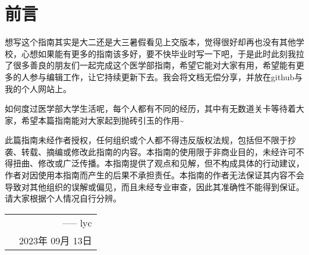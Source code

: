 \thispagestyle{empty}
\chapter*{前言}
想写这个指南其实是大二还是大三暑假看见上交版本，觉得很好却再也没有其他学校，心想如果能有更多的指南该多好，要不快毕业时写一下吧，于是此时此刻我拉了很多善良的朋友们一起完成这个医学部指南，希望它能对大家有用，希望能有更多的人参与编辑工作，让它持续更新下去。我会将文档无偿分享，并放在github与我的个人网站上。

如何度过医学部大学生活呢，每个人都有不同的经历，其中有无数道关卡等待着大家，希望本篇指南能对大家起到抛砖引玉的作用\textasciitilde{}

此篇指南未经作者授权，任何组织或个人都不得违反版权法规，包括但不限于抄袭、转载、摘编或修改此指南的内容。本指南的使用限于非商业目的，未经许可不得扭曲、修改或广泛传播。本指南提供了观点和见解，但不构成具体的行动建议，作者对因使用本指南而产生的后果不承担责任。本指南的作者无法保证其内容不会导致对其他组织的误解或偏见，而且未经专业审查，因此其准确性不能得到保证。请大家根据个人情况自行分辨。



\hfill 
\begin{tabular}{lr}
    &----- lyc\\ 
&2023年 09月 13日
\end{tabular}

\let\cleardoublepage\clearpage
